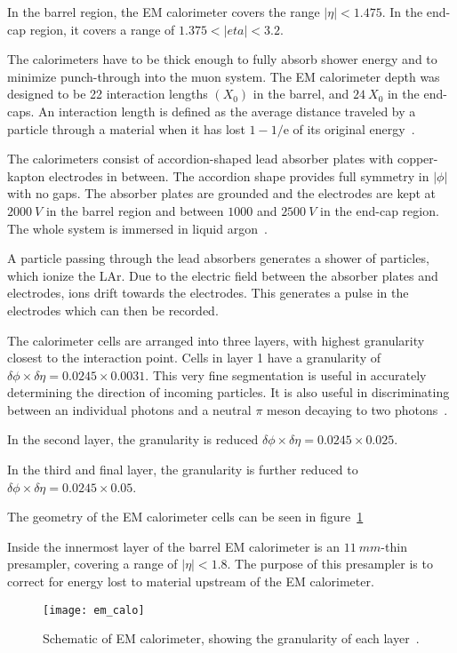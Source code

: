 In the barrel region, the EM calorimeter covers the range $|\eta| < 1.475$.
In the end-cap region, it covers a range of $1.375 < |eta| < 3.2$.

The calorimeters have to be thick enough to fully absorb shower energy and to minimize punch-through into the muon system.
The EM calorimeter depth was designed to be 22 interaction lengths $\left(X_0\right)$ in the barrel, and $24~X_0$ in the end-caps.
An interaction length is defined as the average distance traveled by a particle through a material when it has lost
$1 - 1/\mathrm{e}$ of its original energy~\cite{em-calo}.

The calorimeters consist of accordion-shaped lead absorber plates with copper-kapton electrodes in between.
The accordion shape provides full symmetry in $|\phi|$ with no gaps.
The absorber plates are grounded and the electrodes are kept at $2000~V$ in the barrel region and between
$1000$ and $2500~V$ in the end-cap region.
The whole system is immersed in liquid argon~\cite{atlas-detector-2008}.

A particle passing through the lead absorbers generates a shower of particles, which ionize the LAr.
Due to the electric field between the absorber plates and electrodes, ions drift towards the electrodes.
This generates a pulse in the electrodes which can then be recorded.

The calorimeter cells are arranged into three layers, with highest granularity closest to the interaction point.
Cells in layer 1 have a granularity of $\delta\phi \times \delta\eta = 0.0245 \times 0.0031$.
This very fine segmentation is useful in accurately determining the direction of incoming particles.
It is also useful in discriminating between an individual photons and a neutral $\pi$ meson decaying to two photons~\cite{em-calo}.

In the second layer, the granularity is reduced $\delta\phi \times \delta\eta = 0.0245 \times 0.025$.

In the third and final layer, the granularity is further reduced to $\delta\phi \times \delta\eta = 0.0245 \times 0.05$.

The geometry of the EM calorimeter cells can be seen in figure~\ref{fig:em_calo}

Inside the innermost layer of the barrel EM calorimeter is an $11~mm$-thin presampler, covering a range of $|\eta| < 1.8$.
The purpose of this presampler is to correct for energy lost to material upstream of the EM calorimeter.

\begin{figure}[!ht]\centering
\texttt{[image: em\_calo]}
\caption{Schematic of EM calorimeter, showing the granularity of each layer~\cite{em-calo}.}
\label{fig:em_calo}
\end{figure}

